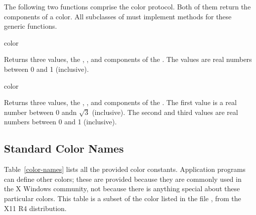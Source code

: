 The following two functions comprise the color protocol.  Both of them return
the components of a color.  All subclasses of  must implement methods
for these generic functions.

 {color}

Returns three values, the , , and  components of
the  . The values are real numbers between 0 and 1
(inclusive).

 {color}

Returns three values, the , , and 
components of the  .  The first value is a real number
between 0 andn $\sqrt{3}$ (inclusive).  The second and third values are real
numbers between 0 and 1 (inclusive).


\subsection {Standard Color Names}

Table~\ref{color-names} lists all the provided color constants.  Application
programs can define other colors; these are provided because they are commonly
used in the X Windows community, not because there is anything special about
these particular colors.  This table is a subset of the color listed in the file
, from the X11 R4 distribution.

